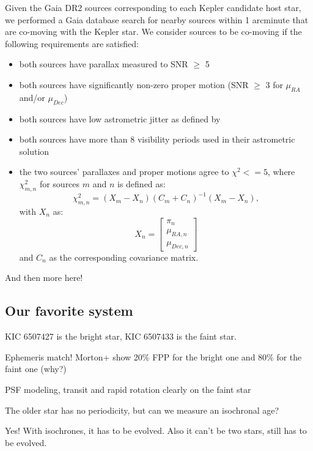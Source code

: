 \documentclass[twocolumn]{aastex62}
\begin{document}
Given the Gaia DR2 sources corresponding to each Kepler candidate host star, we performed a Gaia database search for nearby sources within 1 arcminute that are co-moving with the Kepler star. We consider sources to be co-moving if the following requirements are satisfied:
\begin{itemize}
    \item both sources have parallax measured to SNR $\geq$ 5
    \item both sources have significantly non-zero proper motion (SNR $\geq$ 3 for $\mu_{RA}$ and/or $\mu_{Dec}$)
    \item both sources have low astrometric jitter as defined by \citet{GaiaHR}
    \item both sources have more than 8 visibility periods used in their astrometric solution
    \item the two sources' parallaxes and proper motions agree to $\chi^2 <= 5$, where $\chi_{m,n}^2$ for sources $m$ and $n$ is defined as:
    \begin{equation}
    \chi_{m,n}^2 = (X_m - X_n) (C_m + C_n)^{-1} (X_m - X_n) , 
    \end{equation}
    with $X_n$ as:
    \begin{equation}
    X_n = 
    \begin{bmatrix}
    \pi_n \\
    \mu_{RA, n} \\    
    \mu_{Dec, n}
    \end{bmatrix}
    \end{equation}
    and $C_n$ as the corresponding covariance matrix.
\end{itemize}


And then more here!

\subsection{Our favorite system}

KIC 6507427 is the bright star, KIC 6507433 is the faint star.

Ephemeris match! Morton+ show 20\% FPP for the bright one and 80\% for the faint one (why?)

PSF modeling, transit and rapid rotation clearly on the faint star

The older star has no periodicity, but can we measure an isochronal age?

Yes! With isochrones, it has to be evolved. Also it can't be two stars, still has to be evolved.
\end{document}
